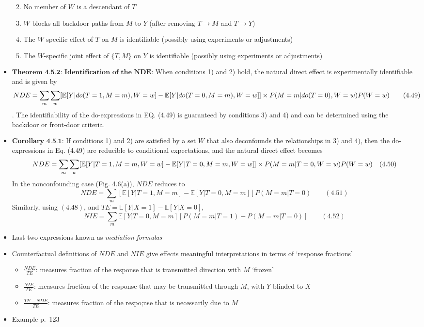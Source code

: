 \documentclass[]{article}
\providecommand{\tightlist}{%
  \setlength{\itemsep}{0pt}\setlength{\parskip}{0pt}}
\begin{document}
\begin{itemize}
  \begin{enumerate}
  \def\labelenumi{\arabic{enumi})}
  \tightlist
  \item
    No member of \(W\) is a descendant of \(T\)
  \item
    \(W\) blocks all backdoor paths from \(M\) to \(Y\) (after removing
    \(T \rightarrow M\) and \(T \rightarrow Y\))
  \item
    The \(W\)-specific effect of \(T\) on \(M\) is identifiable
    (possibly using experiments or adjustments)
  \item
    The \(W\)-specific joint effect of \(\{T, M\}\) on \(Y\) is
    identifiable (possibly using experiments or adjustments)
  \end{enumerate}
\item
  \(\textbf{Theorem 4.5.2: Identification of the NDE}\): When conditions
  1) and 2) hold, the natural direct effect is experimentally
  identifiable and is given by
  \[NDE = \sum\limits_m \sum\limits_w [\mathbb{E}[Y|do(T=1, M = m), W = w] - \mathbb{E}[Y|do(T = 0, M = m), W = w]] \times \\ P(M = m|do(T = 0), W = w)P(W = w) \quad \quad (4.49)\].
  The identifiability of the do-expressions in EQ. (4.49) is guaranteed
  by conditions 3) and 4) and can be determined using the backdoor or
  front-door criteria.
\item
  \(\textbf{Corollary 4.5.1}\): If conditions 1) and 2) are satisfied by
  a set \(W\) that also deconfounds the relationships in 3) and 4), then
  the do-expressions in Eq. (4.49) are reducible to conditional
  expectations, and the natural direct effect becomes
  \[NDE = \sum\limits_m \sum\limits_w [\mathbb{E}[Y|T = 1, M = m, W = w] - \mathbb{E}[Y|T = 0, M = m, W = w]] \\ \times P(M = m|T = 0, W = w)P(W = w) \quad (4.50)\]
  In the nonconfounding case (Fig. 4.6(a)), \(NDE\) reduces to
  \[NDE = \sum\limits_m [\mathbb{E}[Y|T = 1, M = m] - \mathbb{E}[Y|T = 0, M = m]]P(M = m|T = 0) \quad \quad (4.51)\]
  Similarly, using \((4.48)\), and
  \(TE = \mathbb{E}[Y|X = 1] - \mathbb{E}[Y|X = 0]\),
  \[NIE = \sum\limits_m \mathbb{E}[Y|T = 0, M = m][P(M = m|T = 1) - P(M = m|T = 0)] \quad \quad (4.52)\]
\item
  Last two expressions known as \emph{mediation} \emph{formulas}
\item
  Counterfactual definitions of \(NDE\) and \(NIE\) give effects
  meaningful interpretations in terms of `response fractions'

  \begin{itemize}
  \tightlist
  \item
    \(\frac{NDE}{TE}\): measures fraction of the response that is
    transmitted direction with \(M\) `frozen'
  \item
    \(\frac{NIE}{TE}\): measures fraction of the response that may be
    transmitted through \(M\), with \(Y\) blinded to \(X\)
  \item
    \(\frac{TE - NDE}{TE}\): measures fraction of the respo;nse that is
    necessarily due to \(M\)
  \end{itemize}
\item
  Example p.~123


\end{itemize}
\end{document}
